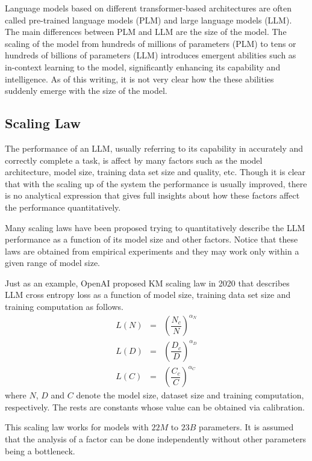Language models based on different transformer-based architectures are often called pre-trained language models (PLM) and large language models (LLM). The main differences between PLM and LLM are the size of the model. The scaling of the model from hundreds of millions of parameters (PLM) to tens or hundreds of billions of parameters (LLM) introduces emergent abilities such as in-context learning to the model, significantly enhancing its capability and intelligence. As of this writing, it is not very clear how the these abilities suddenly emerge with the size of the model.   

\subsection{Scaling Law}

The performance of an LLM, usually referring to its capability in accurately and correctly complete a task, is affect by many factors such as the model architecture, model size, training data set size and quality, etc. Though it is clear that with the scaling up of the system the performance is usually improved, there is no analytical expression that gives full insights about how these factors affect the performance quantitatively.

Many scaling laws have been proposed trying to quantitatively describe the LLM performance as a function of its model size and other factors. Notice that these laws are obtained from empirical experiments and they may work only within a given range of model size.

Just as an example, OpenAI proposed KM scaling law in 2020 that describes LLM cross entropy loss as a function of model size, training data set size and training computation as follows.
\begin{eqnarray}
	L(N) &=& \left(\dfrac{N_c}{N}\right)^{\alpha_N} \nonumber \\
	L(D) &=& \left(\dfrac{D_c}{D}\right)^{\alpha_D} \nonumber \\
	L(C) &=& \left(\dfrac{C_c}{C}\right)^{\alpha_C} \nonumber
\end{eqnarray} 
where $N$, $D$ and $C$ denote the model size, dataset size and training computation, respectively. The rests are constants whose value can be obtained via calibration.

This scaling law works for models with $22M$ to $23B$ parameters. It is assumed that the analysis of a factor can be done independently without other parameters being a bottleneck.

